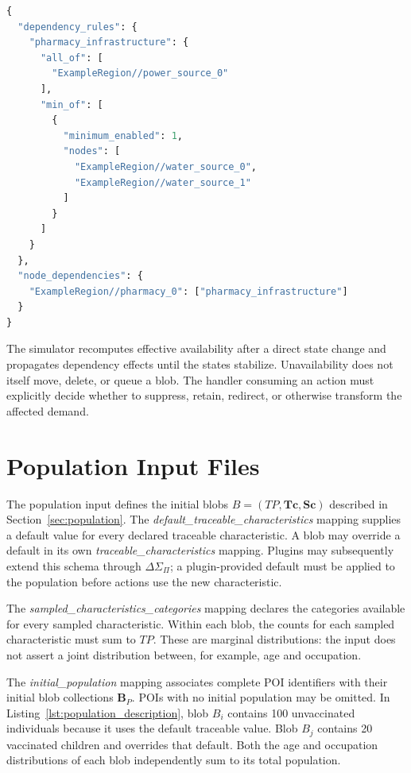 \begin{lstlisting}[language={Python},
caption={Example of all-of and minimum-of POI dependency rules.},
captionpos=b, label={lst:dependency_description}, basicstyle=\scriptsize]
{
  "dependency_rules": {
    "pharmacy_infrastructure": {
      "all_of": [
        "ExampleRegion//power_source_0"
      ],
      "min_of": [
        {
          "minimum_enabled": 1,
          "nodes": [
            "ExampleRegion//water_source_0",
            "ExampleRegion//water_source_1"
          ]
        }
      ]
    }
  },
  "node_dependencies": {
    "ExampleRegion//pharmacy_0": ["pharmacy_infrastructure"]
  }
}
\end{lstlisting}

The simulator recomputes effective availability after a direct state change
and propagates dependency effects until the states stabilize. Unavailability
does not itself move, delete, or queue a blob. The handler consuming an action
must explicitly decide whether to suppress, retain, redirect, or otherwise
transform the affected demand.


\section{Population Input Files}
\label{app:input_population}

The population input defines the initial blobs $B=(TP,\bm{Tc},\bm{Sc})$
described in Section~\ref{sec:population}. The
\textit{default\_traceable\_characteristics} mapping supplies a default value
for every declared traceable characteristic. A blob may override a default in
its own \textit{traceable\_characteristics} mapping. Plugins may subsequently
extend this schema through $\Delta\Sigma_{\Pi}$; a plugin-provided default must
be applied to the population before actions use the new characteristic.

The \textit{sampled\_characteristics\_categories} mapping declares the
categories available for every sampled characteristic. Within each blob, the
counts for each sampled characteristic must sum to $TP$. These are marginal
distributions: the input does not assert a joint distribution between, for
example, age and occupation.

The \textit{initial\_population} mapping associates complete POI identifiers
with their initial blob collections $\bm{B}_{P}$. POIs with no initial
population may be omitted. In Listing~\ref{lst:population_description}, blob
$B_i$ contains 100 unvaccinated individuals because it uses the default
traceable value. Blob $B_j$ contains 20 vaccinated children and overrides that
default. Both the age and occupation distributions of each blob independently
sum to its total population.

